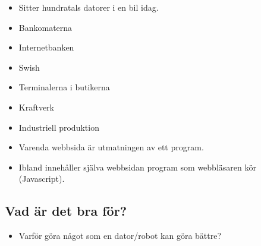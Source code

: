 \begin{frame}
  \begin{example}[Fordon]
    \begin{itemize}
      \item Sitter hundratals datorer i en bil idag.
    \end{itemize}
  \end{example}

  \begin{example}
    \begin{itemize}
      \item Bankomaterna
      \item Internetbanken
      \item Swish
      \item Terminalerna i butikerna
    \end{itemize}
  \end{example}

  \begin{example}
    \begin{itemize}
      \item Kraftverk
      \item Industriell produktion
    \end{itemize}
  \end{example}
\end{frame}

\begin{frame}
  \begin{example}
    \begin{itemize}
      \item Varenda webbsida är utmatningen av ett program.
      \item Ibland innehåller själva webbsidan program som webbläsaren kör 
        (Javascript).
    \end{itemize}
  \end{example}
\end{frame}

\subsection{Vad är det bra för?}

\begin{frame}
  \begin{question}
    \begin{itemize}
      \item Varför göra något som en dator/robot kan göra bättre?
    \end{itemize}
  \end{question}
\end{frame}

